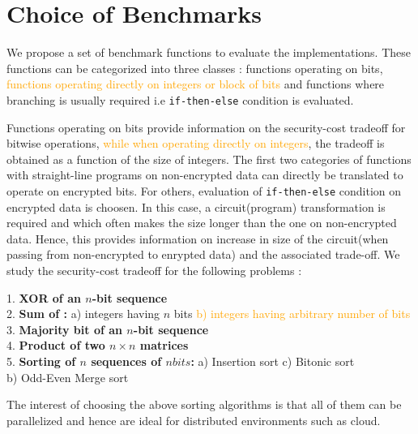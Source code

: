 \documentclass{acm_proc_article-sp}
\begin{document}
\section{Choice of Benchmarks}
\label{sec:bm}

We propose a set of benchmark functions to evaluate the implementations. These functions can be categorized into three classes : functions operating on bits, \textcolor{orange}{functions operating directly on integers or block of bits} and functions where branching is usually required i.e \texttt{if-then-else} condition is evaluated.

Functions operating on bits provide information on the security-cost tradeoff for bitwise operations, \textcolor{orange}{while when operating directly on integers}, the tradeoff is obtained as a function of the size of integers. The first two categories of functions with straight-line programs on non-encrypted data can directly be translated to operate on encrypted bits. For others, evaluation of \texttt{if-then-else} condition on encrypted data is choosen. In this case, a circuit(program) transformation is required and which often makes the size longer than the one on non-encrypted data. Hence, this provides information on increase in size of the circuit(when passing from non-encrypted to enrypted data) and the associated trade-off. We study the security-cost tradeoff for the following problems : 

1. \textbf{XOR of an $n$-bit sequence}\\
2. \textbf{Sum of :}  
\newline\noindent
\phantom{x}\hspace{3ex} a) integers having $n$ bits 
 \textcolor{orange}{b) integers having arbitrary
\newline \phantom{x}\hspace{6ex}  number of bits}\\ 
3. \textbf{Majority bit of an $n$-bit sequence} \\
4. \textbf{Product of two $n\times n$ matrices} \\
5. \textbf{Sorting of $n$ sequences of $nbits$: } \newline\noindent
\phantom{x}\hspace{3ex} a) Insertion sort c) Bitonic sort \\
	\phantom{x}\hspace{3ex} 	     b) Odd-Even Merge sort 

The interest of choosing the above sorting algorithms is that all of them can be parallelized and hence are ideal for distributed environments such as cloud. 
\end{document}
